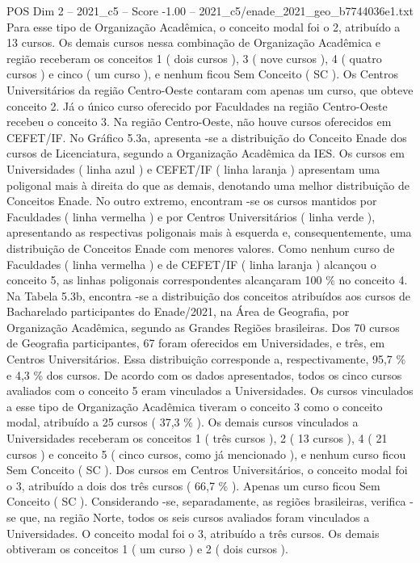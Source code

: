 \begin{textsample}{POS Dim 2 – 2021\_c5 – Score -1.00 – 2021\_c5/enade\_2021\_geo\_b7744036e1.txt}
Para esse tipo de Organização Acadêmica, o conceito modal foi o 2, atribuído a 13 cursos.
Os demais cursos nessa combinação de Organização Acadêmica e região receberam os conceitos 1 ( dois cursos ), 3 ( nove cursos ), 4 ( quatro cursos ) e cinco ( um curso ), e nenhum ficou Sem Conceito ( SC ).
Os Centros Universitários da região Centro-Oeste contaram com apenas um curso, que obteve conceito 2.
Já o único curso oferecido por Faculdades na região Centro-Oeste recebeu o conceito 3.
Na região Centro-Oeste, não houve cursos oferecidos em CEFET/IF.
No Gráfico 5.3a, apresenta -se a distribuição do Conceito Enade dos cursos de Licenciatura, segundo a Organização Acadêmica da IES.
Os cursos em Universidades ( linha azul ) e CEFET/IF ( linha laranja ) apresentam uma poligonal mais à direita do que as demais, denotando uma melhor distribuição de Conceitos Enade.
No outro extremo, encontram -se os cursos mantidos por Faculdades ( linha vermelha ) e por Centros Universitários ( linha verde ), apresentando as respectivas poligonais mais à esquerda e, consequentemente, uma distribuição de Conceitos Enade com menores valores.
Como nenhum curso de Faculdades ( linha vermelha ) e de CEFET/IF ( linha laranja ) alcançou o conceito 5, as linhas poligonais correspondentes alcançaram 100 \% no conceito 4.
Na Tabela 5.3b, encontra -se a distribuição dos conceitos atribuídos aos cursos de Bacharelado participantes do Enade/2021, na Área de Geografia, por Organização Acadêmica, segundo as Grandes Regiões brasileiras.
Dos 70 cursos de Geografia participantes, 67 foram oferecidos em Universidades, e três, em Centros Universitários.
Essa distribuição corresponde a, respectivamente, 95,7 \% e 4,3 \% dos cursos.
De acordo com os dados apresentados, todos os cinco cursos avaliados com o conceito 5 eram vinculados a Universidades.
Os cursos vinculados a esse tipo de Organização Acadêmica tiveram o conceito 3 como o conceito modal, atribuído a 25 cursos ( 37,3 \% ).
Os demais cursos vinculados a Universidades receberam os conceitos 1 ( três cursos ), 2 ( 13 cursos ), 4 ( 21 cursos ) e conceito 5 ( cinco cursos, como já mencionado ), e nenhum curso ficou Sem Conceito ( SC ).
Dos cursos em Centros Universitários, o conceito modal foi o 3, atribuído a dois dos três cursos ( 66,7 \% ).
Apenas um curso ficou Sem Conceito ( SC ).
Considerando -se, separadamente, as regiões brasileiras, verifica -se que, na região Norte, todos os seis cursos avaliados foram vinculados a Universidades.
O conceito modal foi o 3, atribuído a três cursos.
Os demais obtiveram os conceitos 1 ( um curso ) e 2 ( dois cursos ).

\end{textsample}
